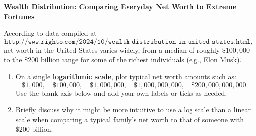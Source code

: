 \documentclass[noauthor,nooutcomes,handout,hints,12pt]{ximera}
\begin{document}
\mynewpage

\begin{question}
    \textbf{Wealth Distribution: Comparing Everyday Net Worth to Extreme
        Fortunes}

    According to data compiled at
    \[
        \texttt{http://www.righto.com/2024/10/wealth-distribution-in-united-states.html},
    \]
    net worth in the United States varies widely, from a median of
    roughly \(\$100{,}000\) to the \(\$200\) billion range for some of the
    richest individuals (e.g., Elon Musk).

    \begin{enumerate}
        \item On a single \textbf{logarithmic scale}, plot typical net worth
              amounts such as:
              \[
                  \$1{,}000,\quad \$100{,}000,\quad \$1{,}000{,}000,\quad
                  \$1{,}000{,}000{,}000,\quad
                  \$200{,}000{,}000{,}000.
              \]
              Use the blank axis below and add your own labels or ticks as
              needed.

        \item Briefly discuss why it might be more intuitive to use a log scale
              than a linear scale when comparing a typical family’s net worth
              to
              that of someone with \(\$200\) billion.
    \end{enumerate}

    \begin{center}
    \end{center}
\end{question}
\end{document}
